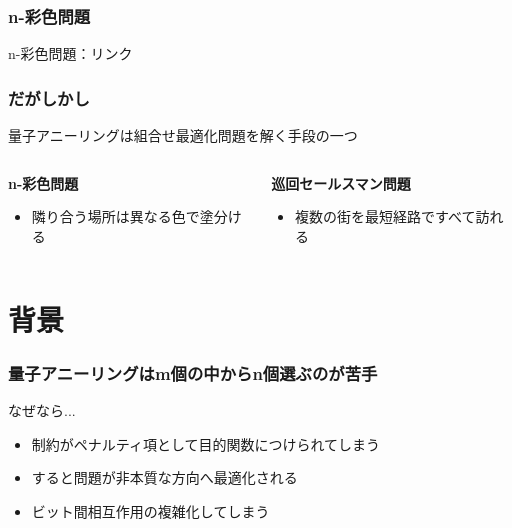 \begin{frame}
  \frametitle{n-彩色問題}
  n-彩色問題：リンク\\
\end{frame}


\begin{frame}
  \frametitle{だがしかし}

  {\Large  量子アニーリングは組合せ最適化問題を解く手段の一つ}
  \vspace{5mm}

  \begin{columns}
    \begin{column}{0.45\textwidth}
      \textbf{n-彩色問題}
      \begin{itemize}
          \item 隣り合う場所は異なる色で塗分ける
      \end{itemize}
    \end{column}

    \begin{column}{0.45\textwidth}
      \textbf{巡回セールスマン問題}
      \begin{itemize}
          \item 複数の街を最短経路ですべて訪れる
      \end{itemize}
    \end{column}
  \end{columns}
  \vspace{10mm}
\end{frame}

\section{背景}
\begin{frame}
  \frametitle{量子アニーリングはm個の中からn個選ぶのが苦手}
  
  なぜなら...\\
  \begin{itemize}
    \item 制約がペナルティ項として目的関数につけられてしまう
    \item すると問題が非本質な方向へ最適化される\cite{Okada_2019}
    \item ビット間相互作用の複雑化してしまう\cite{boothby2019d}
  \end{itemize}

  \vspace{5mm}



\end{frame}

